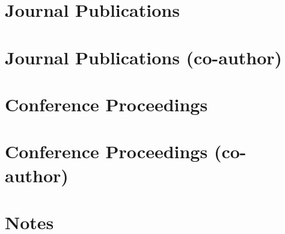 


\section*{Journal Publications}




\section*{Journal Publications (co-author)}




\section*{Conference Proceedings}




\section*{Conference Proceedings (co-author)}


\begin{publist}
 \item {}
\end{publist}




\section*{Notes}